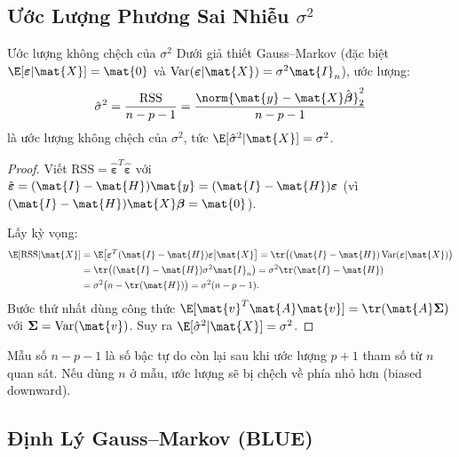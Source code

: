 \subsection{Ước Lượng Phương Sai Nhiễu $\sigma^2$}

\begin{mythm}{Ước lượng không chệch của $\sigma^2$}{}
Dưới giả thiết Gauss--Markov (đặc biệt $\E[\boldsymbol{\varepsilon}|\mat{X}] = \mat{0}$
và $\mathrm{Var}(\boldsymbol{\varepsilon}|\mat{X}) = \sigma^2\mat{I}_n$), ước lượng:
\[
    \hat{\sigma}^2
    = \frac{\mathrm{RSS}}{n - p - 1}
    = \frac{\norm{\mat{y} - \mat{X}\hat{\boldsymbol{\beta}}}_2^2}{n - p - 1}
\]
là ước lượng không chệch của $\sigma^2$, tức $\E[\hat{\sigma}^2|\mat{X}] = \sigma^2$.
\end{mythm}

\begin{proof}
Viết $\mathrm{RSS} = \hat{\boldsymbol{\varepsilon}}^T\hat{\boldsymbol{\varepsilon}}$
với $\hat{\boldsymbol{\varepsilon}} = (\mat{I}-\mat{H})\mat{y}
= (\mat{I}-\mat{H})\boldsymbol{\varepsilon}$ (vì
$(\mat{I}-\mat{H})\mat{X}\boldsymbol{\beta} = \mat{0}$).

Lấy kỳ vọng:
\begin{align*}
    \E[\mathrm{RSS}|\mat{X}]
    &= \E\bigl[\boldsymbol{\varepsilon}^T(\mat{I}-\mat{H})\boldsymbol{\varepsilon}
               \big|\mat{X}\bigr]
     = \tr\bigl((\mat{I}-\mat{H})\,\mathrm{Var}(\boldsymbol{\varepsilon}|\mat{X})\bigr) \\
    &= \tr\bigl((\mat{I}-\mat{H})\sigma^2\mat{I}_n\bigr)
     = \sigma^2\tr(\mat{I}-\mat{H}) \\
    &= \sigma^2\bigl(n - \tr(\mat{H})\bigr)
     = \sigma^2(n - p - 1).
\end{align*}
Bước thứ nhất dùng công thức $\E[\mat{v}^T\mat{A}\mat{v}] = \tr(\mat{A}\boldsymbol{\Sigma})$
với $\boldsymbol{\Sigma} = \mathrm{Var}(\mat{v})$.
Suy ra $\E[\hat{\sigma}^2|\mat{X}] = \sigma^2$.
\end{proof}

\begin{note}
Mẫu số $n - p - 1$ là số bậc tự do còn lại sau khi ước lượng $p+1$ tham số từ
$n$ quan sát. Nếu dùng $n$ ở mẫu, ước lượng sẽ bị chệch về phía nhỏ hơn (biased
downward).
\end{note}

\subsection{Định Lý Gauss–Markov (BLUE)}
\label{subsec:blue}

